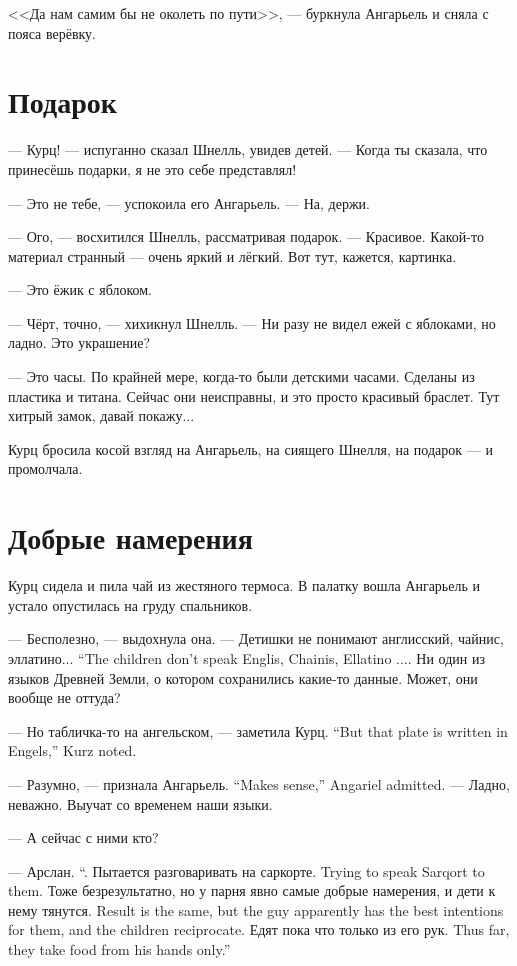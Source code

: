 <<Да нам самим бы не околеть по пути>>, --- буркнула Ангарьель и сняла с пояса верёвку.

\section{Подарок}

--- Курц! --- испуганно сказал Шнелль, увидев детей.
--- Когда ты сказала, что принесёшь подарки, я не это себе представлял!

--- Это не тебе, --- успокоила его Ангарьель.
--- На, держи.

--- Ого, --- восхитился Шнелль, рассматривая подарок.
--- Красивое.
Какой-то материал странный --- очень яркий и лёгкий.
Вот тут, кажется, картинка.

--- Это ёжик с яблоком.

--- Чёрт, точно, --- хихикнул Шнелль.
--- Ни разу не видел ежей с яблоками, но ладно.
Это украшение?

--- Это часы.
По крайней мере, когда-то были детскими часами.
Сделаны из пластика и титана.
Сейчас они неисправны, и это просто красивый браслет.
Тут хитрый замок, давай покажу...

Курц бросила косой взгляд на Ангарьель, на сиящего Шнелля, на подарок --- и промолчала.

\section{Добрые намерения}

Курц сидела и пила чай из жестяного термоса.
В палатку вошла Ангарьель и устало опустилась на груду спальников.

--- Бесполезно, --- выдохнула она.
{--- Детишки не понимают англисский, чайнис, эллатино...}
{``The children don't speak Englis, Chainis, Ellatino ....}
Ни один из языков Древней Земли, о котором сохранились какие-то данные.
Может, они вообще не оттуда?

{--- Но табличка-то на ангельском, --- заметила Курц.}
{``But that plate is written in Engels,'' Kurz noted.}

{--- Разумно, --- признала Ангарьель.}
{``Makes sense,'' Angariel admitted.}
--- Ладно, неважно.
Выучат со временем наши языки.

--- А сейчас с ними кто?

{--- Арслан.}
{``\Arythlan.}
{Пытается разговаривать на саркорте.}
{Trying to speak Sarqort to them.}
{Тоже безрезультатно, но у парня явно самые добрые намерения, и дети к нему тянутся.}
{Result is the same, but the guy apparently has the best intentions for them, and the children reciprocate.}
{Едят пока что только из его рук.}
{Thus far, they take food from his hands only.''}

